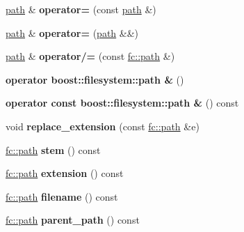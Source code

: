 \begin{DoxyCompactItemize}
\mbox{\hyperlink{classfc_1_1path}{path}} \& {\bfseries operator=} (const \mbox{\hyperlink{classfc_1_1path}{path}} \&)
\item 
\mbox{\label{classfc_1_1path_abd300298b33db4c752481d93245fcbf4}} 
\mbox{\hyperlink{classfc_1_1path}{path}} \& {\bfseries operator=} (\mbox{\hyperlink{classfc_1_1path}{path}} \&\&)
\item 
\mbox{\label{classfc_1_1path_addfacdbec90fcbdea3161373d314300d}} 
\mbox{\hyperlink{classfc_1_1path}{path}} \& {\bfseries operator/=} (const \mbox{\hyperlink{classfc_1_1path}{fc\+::path}} \&)
\item 
\mbox{\label{classfc_1_1path_a2630b0783273ac09a6db1ecec3661581}} 
{\bfseries operator boost\+::filesystem\+::path \&} ()
\item 
\mbox{\label{classfc_1_1path_a39e648d6b1da8270dafeb4b927b984be}} 
{\bfseries operator const boost\+::filesystem\+::path \&} () const
\item 
\mbox{\label{classfc_1_1path_af7de3b21cee1e93c7496e480181e7af2}} 
void {\bfseries replace\+\_\+extension} (const \mbox{\hyperlink{classfc_1_1path}{fc\+::path}} \&e)
\item 
\mbox{\label{classfc_1_1path_a6756e8e4adb1f4f2423f454adfbbf205}} 
\mbox{\hyperlink{classfc_1_1path}{fc\+::path}} {\bfseries stem} () const
\item 
\mbox{\label{classfc_1_1path_ab0d2cca0994e599a7d65a89c5c8f9e54}} 
\mbox{\hyperlink{classfc_1_1path}{fc\+::path}} {\bfseries extension} () const
\item 
\mbox{\label{classfc_1_1path_a1e6beb6e05c3f6d6f699c1c448c4b1d6}} 
\mbox{\hyperlink{classfc_1_1path}{fc\+::path}} {\bfseries filename} () const
\item 
\mbox{\label{classfc_1_1path_a10985bab813b9197980458e4345d0f36}} 
\mbox{\hyperlink{classfc_1_1path}{fc\+::path}} {\bfseries parent\+\_\+path} () const
\item 
\mbox{\label{classfc_1_1path_aaf0107e4a41f9977032b2a604161cf85}} 

\end{DoxyCompactItemize}
